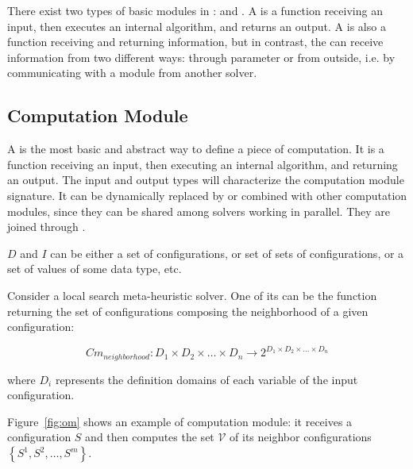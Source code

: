 There exist two types of basic modules in \posl: \oms{} and \opchs{}. A \om{} is a function receiving an input, then executes an internal algorithm, and returns an output. A \opch{} is also a function receiving and returning information, but in contrast, the \opch{} can receive information from two different ways: through parameter or from outside, i.e. by communicating with a module from another solver.

\subsection{Computation Module}


A \om{} is the most basic and abstract way to define a piece of computation. It is a function receiving an input, then executing an internal algorithm, and returning an output. The input and output types will characterize the computation module signature. It can be dy\-na\-mi\-cally replaced by or combined with other computation modules, since they can be shared among solvers working in parallel. They are joined through \ass.


$D$ and $I$ can be either a set of configurations, or set of sets of configurations, or a set of values of some data type, etc.

Consider a local search meta-heuristic solver. One of its \oms{} can be the function returning the set of configurations composing the neighborhood of a given configuration:

\begin{equation*}
Cm_{neighborhood}:D_1\times D_2\times\dots\times D_n \rightarrow 2^{D_1\times D_2\times\dots\times D_n}
\end{equation*}

\noindent where $D_i$ represents the definition domains of each variable of the input confi\-gura\-tion.

Figure~\ref{fig:om} shows an example of computation module: it receives a configuration $S$ and then computes the set $\mathcal{V}$ of its neighbor configurations $\left\{S^1, S^2, \dots, S^m\right\}$.


